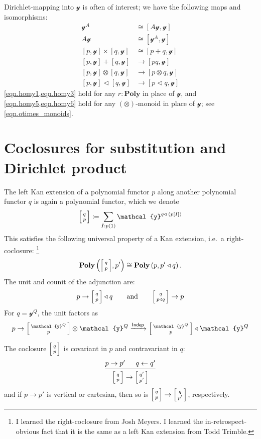 \documentclass[11pt, one side, article]{memoir}
\makeatletter
\theoremstyle{definition}
\theoremstyle{plain}
\newcommand{\Cat}[1]{\mathbf{#1}}%
\newcommand{\Fun}[1]{\mathsf{#1}}%
\newcommand{\To}[2][]{\xrightarrow[#1]{\tn{$#2$}}}
\newcommand{\from}{\leftarrow}
\newcommand{\tn}[1]{\textnormal{#1}}
\newcommand{\yon}{{\mathcal{y}}}
\newcommand{\poly}{\Cat{Poly}}
\newcommand{\0}{\textsf{0}}
\newcommand{\1}{\tn{\textsf{1}}}
\newcommand{\tri}{\mathbin{\triangleleft}}
\newcommand{\indep}{\Fun{Indep}}
\newcommand{\biglens}[2]{
     \begin{bmatrix}{\vphantom{f_f^f}#2} \\ {\vphantom{f_f^f}#1} \end{bmatrix}
}
\newcommand{\littlelens}[2]{
     \begin{bsmallmatrix}{\vphantom{f}#2} \\ {\vphantom{f}#1} \end{bsmallmatrix}
}
\newcommand{\lens}[2]{
  \relax\if@display
     \biglens{#1}{#2}
  \else
     \littlelens{#1}{#2}
  \fi
}
\newcommand{\hh}[2][]{#1 \tn{#2} #1}
\newcommand{\qqand}{\hh[\qquad]{and}}
\makeatother
\begin{document}
Dirichlet-mapping into $\yon$ is often of interest; we have the following maps and isomorphisms:
\begin{align}
\label{eqn.homy2}
  \yon^A&\cong[A\yon,\yon]\\
\label{eqn.homy4}
  A\yon&\cong[\yon^A,\yon]\\
\label{eqn.homy1}
  [p,\yon]\times[q,\yon]&\cong[p+q,\yon]\\
\label{eqn.homy3}
  [p,\yon]+[q,\yon]&\to[pq,\yon]\\
\label{eqn.homy5}
	[p,\yon]\otimes[q,\yon]&\to[p\otimes q,\yon]\\
\label{eqn.homy6}
	[p,\yon]\tri[q,\yon]&\to[p\tri q,\yon]
\end{align}
\cref{eqn.homy1,eqn.homy3} hold for any $r:\poly$ in place of $\yon$, and \cref{eqn.homy5,eqn.homy6} hold for any $(\otimes)$-monoid in place of $\yon$; see \cref{eqn.otimes_monoids}.


\chapter{Coclosures for substitution and Dirichlet product}

The left Kan extension of a polynomial functor $p$ along another polynomial functor $q$ is again a polynomial functor, which we denote
\begin{equation}
\lens{p}{q}\coloneqq\sum_{I: p(1)}\yon^{q\tri\; (p[I])}
\end{equation}
This satisfies the following universal property of a Kan extension, i.e.\ a right-coclosure:%
\footnote{I learned the right-coclosure from Josh Meyers. I learned the in-retrospect-obvious fact that it is the same as a left Kan extension from Todd Trimble.}
\begin{equation}\label{eqn.cocl_define}
	\poly\left(\lens{p}{q},p'\right)\cong\poly\left(p,p'\tri q\right).
\end{equation}
The unit and counit of the adjunction are:
\begin{equation}\label{eqn.coclosure_unit_counit}
  p\to\lens{p}{q}\tri q
  \qqand
	\lens{p\tri q}{q}\to p
\end{equation}
For $q=\yon^Q$, the unit factors as
\begin{equation}
	p\to\lens{p}{\yon^Q}\otimes\yon^Q\To{\indep}\lens{p}{\yon^Q}\tri\yon^Q
\end{equation}

The coclosure $\lens{p}{q}$ is covariant in $p$ and contravariant in $q$:
\begin{equation}
  \begin{prooftree}
  	\Hypo{p\to p'}
  	\Hypo{q\from q'}
    \Infer2{\lens{p}{q}\to\lens{p'}{q'}}
  \end{prooftree}
\end{equation}
and if $p\to p'$ is vertical or cartesian, then so is $\lens{p}{q}\to\lens{p'}{q}$, respectively. 
\end{document}
